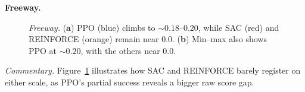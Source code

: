 \noindent \textbf{Freeway.}
\begin{figure} 
	\centering
	\quad
	\caption{\emph{Freeway.}
		(\textbf{a}) PPO (blue) climbs to \(\sim0.18\)--0.20, while SAC (red) and REINFORCE (orange) remain near 0.0.
		(\textbf{b}) Min--max also shows PPO at \(\sim0.20\), with the others near 0.0.}
	\label{fig:freeway_combined}
\end{figure}

\noindent
\emph{Commentary.} Figure~\ref{fig:freeway_combined} illustrates how SAC and REINFORCE barely register on either scale, as PPO’s partial success reveals a bigger raw score gap.

\medskip

